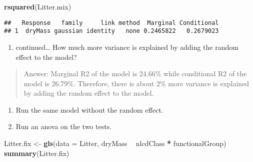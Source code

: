 \documentclass[]{article}
\newenvironment{Shaded}{\begin{snugshade}}{\end{snugshade}}
\newcommand{\KeywordTok}[1]{\textcolor[rgb]{0.13,0.29,0.53}{\textbf{#1}}}
\newcommand{\DataTypeTok}[1]{\textcolor[rgb]{0.13,0.29,0.53}{#1}}
\newcommand{\StringTok}[1]{\textcolor[rgb]{0.31,0.60,0.02}{#1}}
\newcommand{\OperatorTok}[1]{\textcolor[rgb]{0.81,0.36,0.00}{\textbf{#1}}}
\newcommand{\NormalTok}[1]{#1}
\providecommand{\tightlist}{%
  \setlength{\itemsep}{0pt}\setlength{\parskip}{0pt}}
\begin{document}
\begin{Shaded}
\begin{Highlighting}[]
\KeywordTok{rsquared}\NormalTok{(Litter.mix)}
\end{Highlighting}
\end{Shaded}

\begin{verbatim}
##   Response   family     link method  Marginal Conditional
## 1  dryMass gaussian identity   none 0.2465822   0.2679023
\end{verbatim}

\begin{enumerate}
\def\labelenumi{\alph{enumi}.}
\setcounter{enumi}{1}
\tightlist
\item
  continued\ldots{} How much more variance is explained by adding the
  random effect to the model?
\end{enumerate}

\begin{quote}
Answer: Marginal R2 of the model is 24.66\% while conditional R2 of the
model is 26.79\%. Therefore, there is about 2\% more variance is
explained by adding the random effect to the model.
\end{quote}

\begin{enumerate}
\def\labelenumi{\alph{enumi}.}
\setcounter{enumi}{2}
\tightlist
\item
  Run the same model without the random effect.
\item
  Run an anova on the two tests.
\end{enumerate}

\begin{Shaded}
\begin{Highlighting}[]
\NormalTok{Litter.fix <-}\StringTok{ }\KeywordTok{gls}\NormalTok{(}\DataTypeTok{data =}\NormalTok{ Litter, dryMass }\OperatorTok{~}\StringTok{ }\NormalTok{nlcdClass }\OperatorTok{*}\StringTok{ }\NormalTok{functionalGroup)}
\KeywordTok{summary}\NormalTok{(Litter.fix)}
\end{Highlighting}
\end{Shaded}
\end{document}
